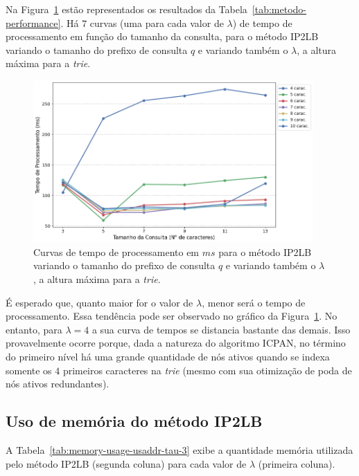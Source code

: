 Na Figura~\ref{fig:varying-usaddr-tau-3} estão representados os resultados da Tabela~\ref{tab:metodo-performance}. Há $7$ curvas (uma para cada valor de $\lambda$) de tempo de processamento em função do tamanho da consulta, para o método IP2LB variando o tamanho do prefixo de consulta $q$ e variando também o $\lambda$, a altura máxima para a \textit{trie}. 

\begin{figure}[ht!]
    \centering
    \includegraphics[width=0.95\textwidth]{figures/varying_trie_prefix_method_IP2LB_dataset_usaddr_tau_3.png}
    \caption{Curvas de tempo de processamento em $ms$ para o método IP2LB variando o tamanho do prefixo de consulta $q$ e variando também o $\lambda$, a altura máxima para a \textit{trie}.}
    \label{fig:varying-usaddr-tau-3}
\end{figure}

É esperado que, quanto maior for o valor de $\lambda$, menor será o tempo de processamento. Essa tendência pode ser observado no gráfico da Figura~\ref{fig:varying-usaddr-tau-3}. No entanto, para $\lambda = 4$ a sua curva de tempos se distancia bastante das demais. Isso provavelmente ocorre porque, dada a natureza do algoritmo ICPAN, no término do primeiro nível há uma grande quantidade de nós ativos quando se indexa somente os $4$ primeiros caracteres na \textit{trie} (mesmo com sua otimização de poda de nós ativos redundantes).

\subsection{Uso de memória do método IP2LB}

A Tabela~\ref{tab:memory-usage-usaddr-tau-3} exibe a quantidade memória utilizada pelo método IP2LB (segunda coluna) para cada valor de $\lambda$ (primeira coluna).

